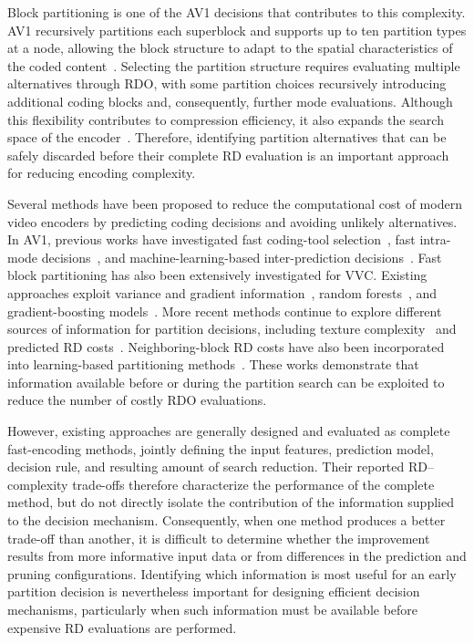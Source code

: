 \documentclass{article}
\begin{document}
Block partitioning is one of the AV1 decisions that contributes to this complexity. AV1 recursively partitions each superblock and supports up to ten partition types at a node, allowing the block structure to adapt to the spatial characteristics of the coded content~\cite{han2021av1overview,chen2018av1tools}. Selecting the partition structure requires evaluating multiple alternatives through RDO, with some partition choices recursively introducing additional coding blocks and, consequently, further mode evaluations. Although this flexibility contributes to compression efficiency, it also expands the search space of the encoder~\cite{bender2023av1complexity}. Therefore, identifying partition alternatives that can be safely discarded before their complete RD evaluation is an important approach for reducing encoding complexity.

Several methods have been proposed to reduce the computational cost of modern video encoders by predicting coding decisions and avoiding unlikely alternatives. In AV1, previous works have investigated fast coding-tool selection~\cite{xu2020fastav1intra,xu2021av1toolselection}, fast intra-mode decisions~\cite{jeong2019fastav1intra}, and machine-learning-based inter-prediction decisions~\cite{kim2019fastav1inter}. Fast block partitioning has also been extensively investigated for VVC. Existing approaches exploit variance and gradient information~\cite{chen2019fastvvcqtmt}, random forests~\cite{he2021fastvvcrandomforest}, and gradient-boosting models~\cite{saldanha2022fastvvcpartitioning}. More recent methods continue to explore different sources of information for partition decisions, including texture complexity~\cite{song2024fastvvcpartitioning} and predicted RD costs~\cite{kherchouche2024vvcrdcostregression}. Neighboring-block RD costs have also been incorporated into learning-based partitioning methods~\cite{kherchouche2025vvcrdcostapproximation}. These works demonstrate that information available before or during the partition search can be exploited to reduce the number of costly RDO evaluations.

However, existing approaches are generally designed and evaluated as complete fast-encoding methods, jointly defining the input features, prediction model, decision rule, and resulting amount of search reduction. Their reported RD--complexity trade-offs therefore characterize the performance of the complete method, but do not directly isolate the contribution of the information supplied to the decision mechanism. Consequently, when one method produces a better trade-off than another, it is difficult to determine whether the improvement results from more informative input data or from differences in the prediction and pruning configurations. Identifying which information is most useful for an early partition decision is nevertheless important for designing efficient decision mechanisms, particularly when such information must be available before expensive RD evaluations are performed.
\end{document}
